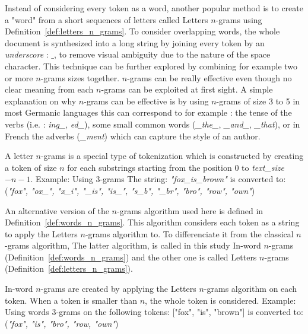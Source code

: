 Instead of considering every token as a word, another popular method is to create a "word" from a short sequences of letters called Letters $n$-grams using Definition~\ref{def:letters_n_grams}.
To consider overlapping words, the whole document is synthesized into a long string by joining every token by an \textit{underscore} : $\_$, to remove visual ambiguity due to the nature of the space character.
This technique can be further explored by combining for example two or more $n$-grams sizes together.
$n$-grams can be really effective even though no clear meaning from each $n$-grams can be exploited at first sight.
A simple explanation on why $n$-grams can be effective is by using $n$-grams of size 3 to 5 in most Germanic languages this can correspond to for example : the tense of the verbs (i.e. : \textit{ing\_}, \textit{ed\_}), some small common words (\textit{\_the\_}, \textit{\_and\_}, \textit{\_that}), or in French the adverbs (\textit{\_ment}) which can capture the style of an author.

\begin{definition}
  \label{def:letters_n_grams}
  A letter $n$-grams is a special type of tokenization which is constructed by creating a token of size $n$ for each substrings starting from the position $0$ to \textit{text\_size} $- n - 1$.
  Example: Using 3-grams The string: \textit{"fox\_is\_brown"} is converted to: (\textit{"fox", "ox\_", "x\_i", "\_is", "is\_", "s\_b", "\_br", "bro", "row", "own"})
\end{definition}

An alternative version of the $n$-grams algorithm used here is defined in Definition~\ref{def:words_n_grams}.
This algorithm considers each token as a string to apply the Letters $n$-grams algorithm to.
To differenciate it from the classical $n$-grams algorithm,
The latter algorithm, is called in this study In-word $n$-grams (Definition~\ref{def:words_n_grams}) and the other one is called Letters $n$-grams (Definition~\ref{def:letters_n_grams}).

\begin{definition}
  \label{def:words_n_grams}
  In-word $n$-grams are created by applying the Letters $n$-grams algorithm on each token.
  When a token is smaller than $n$, the whole token is considered.
  Example: Using words 3-grams on the following tokens: ["fox", "is", "brown"] is converted to: (\textit{"fox", "is", "bro", "row, "own"})
\end{definition}

